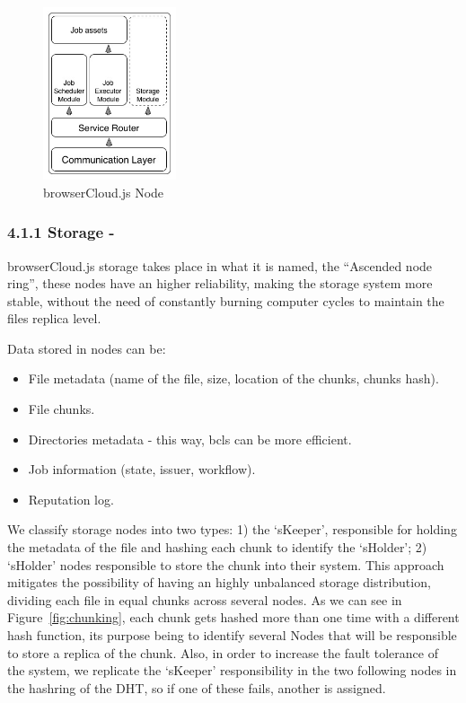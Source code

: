 \begin{figure}[h!]
  \centering
  \includegraphics[width=0.35\textwidth]{img/node.jpg}
  \caption{browserCloud.js Node}
  \label{fig:hcnode}
\end{figure}

\subsubsection{4.1.1 Storage -}

browserCloud.js storage takes place in what it is named, the ``Ascended node ring'', these nodes have an higher reliability, making the storage system more stable, without the need of constantly burning computer cycles to maintain the files replica level.

Data stored in nodes can be:
\begin{itemize}
  \item File metadata (name of the file, size, location of the chunks, chunks hash).
  \item File chunks.
  \item Directories metadata - this way, bcls can be more efficient.
  \item Job information (state, issuer, workflow).
  \item Reputation log.
\end{itemize}

We classify storage nodes into two types: 1) the `sKeeper', responsible for holding the metadata of the file and hashing each chunk to identify the `sHolder'; 2) `sHolder' nodes responsible to store the chunk into their system. This approach mitigates the possibility of having an highly unbalanced storage distribution, dividing each file in equal chunks across several nodes. As we can see in Figure~\ref{fig:chunking}, each chunk gets hashed more than one time with a different hash function, its purpose being to identify several Nodes that will be responsible to store a replica of the chunk. Also, in order to increase the fault tolerance of the system, we replicate the `sKeeper' responsibility in the two following nodes in the hashring of the DHT, so if one of these fails, another is assigned.

